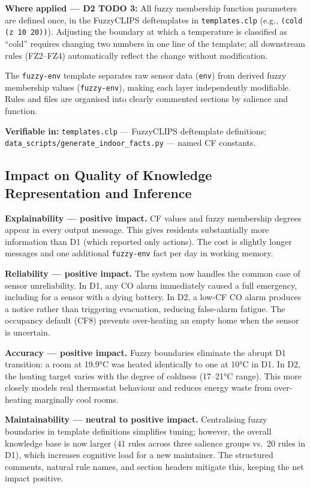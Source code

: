 \documentclass{article}
\begin{document}
\textbf{Where applied — D2 TODO 3:} All fuzzy membership function parameters are defined once, in the FuzzyCLIPS deftemplates in \texttt{templates.clp} (e.g., \texttt{(cold (z 10 20))}). Adjusting the boundary at which a temperature is classified as ``cold'' requires changing two numbers in one line of the template; all downstream rules (FZ2–FZ4) automatically reflect the change without modification.

The \texttt{fuzzy-env} template separates raw sensor data (\texttt{env}) from derived fuzzy membership values (\texttt{fuzzy-env}), making each layer independently modifiable. Rules and files are organised into clearly commented sections by salience and function.

\textbf{Verifiable in:} \texttt{templates.clp} — FuzzyCLIPS deftemplate definitions; \texttt{data\_scripts/generate\_indoor\_facts.py} — named CF constants.

\subsection{Impact on Quality of Knowledge Representation and Inference}

\textbf{Explainability — positive impact.} CF values and fuzzy membership degrees appear in every output message. This gives residents substantially more information than D1 (which reported only actions). The cost is slightly longer messages and one additional \texttt{fuzzy-env} fact per day in working memory.

\textbf{Reliability — positive impact.} The system now handles the common case of sensor unreliability. In D1, any CO alarm immediately caused a full emergency, including for a sensor with a dying battery. In D2, a low-CF CO alarm produces a notice rather than triggering evacuation, reducing false-alarm fatigue. The occupancy default (CF8) prevents over-heating an empty home when the sensor is uncertain.

\textbf{Accuracy — positive impact.} Fuzzy boundaries eliminate the abrupt D1 transition: a room at 19.9°C was heated identically to one at 10°C in D1. In D2, the heating target varies with the degree of coldness (17–21°C range). This more closely models real thermostat behaviour and reduces energy waste from over-heating marginally cool rooms.

\textbf{Maintainability — neutral to positive impact.} Centralising fuzzy boundaries in template definitions simplifies tuning; however, the overall knowledge base is now larger (41 rules across three salience groups vs.\ 20 rules in D1), which increases cognitive load for a new maintainer. The structured comments, natural rule names, and section headers mitigate this, keeping the net impact positive.
\end{document}
